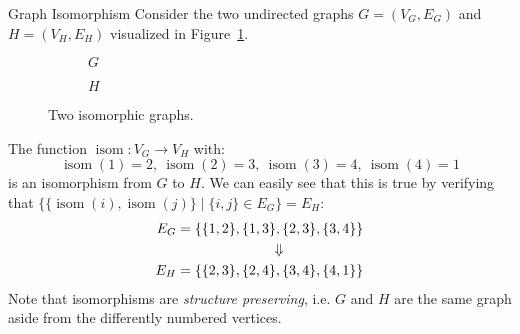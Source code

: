 \begin{exmp}{Graph Isomorphism}
  Consider the two undirected graphs $G = (V_G, E_G)$ and $H = (V_H, E_H)$
  visualized in Figure~\ref{fig:undirected_graph_isomorphism}.
  \begin{figure}[H]
    \centering
    \begin{subfigure}{.3\textwidth}
      \centering
      \caption{$G$}
    \end{subfigure}
    \begin{subfigure}{.3\textwidth}
      \centering
      \caption{$H$}
    \end{subfigure}
    \caption{Two isomorphic graphs.}
    \label{fig:undirected_graph_isomorphism}
  \end{figure}
  \noindent
  The function $\operatorname{isom}: V_G \rightarrow V_H$ with:
  \begin{equation*}
    \operatorname{isom}(1) = 2,\ \operatorname{isom}(2) = 3,\
    \operatorname{isom}(3) = 4,\ \operatorname{isom}(4) = 1
  \end{equation*}
  is an isomorphism from $G$ to $H$. We can easily see that this is true by
  verifying that $\{\{\operatorname{isom}(i), \operatorname{isom}(j)\} \mid \{i,
  j\} \in E_G\} = E_H$:
  \begin{align*}
    E_G = \{\{1,2\},\{1,3\}&,\{2,3\},\{3,4\}\} \\
                           &\symbolwithin{\Downarrow}{,} \\
    E_H = \{\{2,3\},\{2,4\}&,\{3,4\},\{4,1\}\}
  \end{align*}
  Note that isomorphisms are \textit{structure preserving}, i.e. $G$ and $H$
  are the same graph aside from the differently numbered vertices.
\end{exmp}

